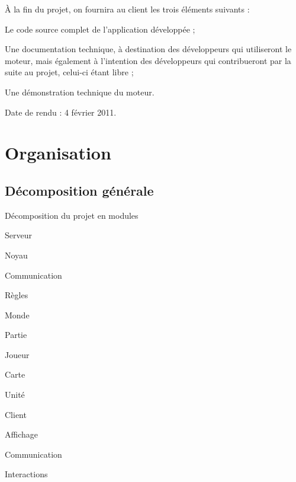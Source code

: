 \documentclass[a4paper,10pt]{report}
\begin{document}
    À la fin du projet, on fournira au client les trois éléments suivants : 
    
    \begin{list}{-}{}
      \item{Le code source complet de l'application développée ;}
      \item{Une documentation technique, à destination des développeurs qui utiliseront le moteur, mais également à l'intention des développeurs qui contribueront par la suite au projet, celui-ci étant libre ;}
      \item{Une démonstration technique du moteur.}
    \end{list}
    
    Date de rendu : 4 février 2011.



  \chapter{Organisation}

    \section{Décomposition générale}

      Décomposition du projet en modules
      
      \begin{list}{-}{}
        \item{Serveur}
        \begin{list}{-}{}
          \item{Noyau}
          \begin{list}{-}{}
            \item{Communication}
            \item{Règles}
          \end{list}
          \item{Monde}
          \begin{list}{-}{}
            \item{Partie}
            \item{Joueur}
            \item{Carte}
            \item{Unité}
          \end{list}
        \end{list}
        
        \item{Client}
        \begin{list}{-}{}
          \item{Affichage}
          \item{Communication}
          \item{Interactions}
        \end{list}
      \end{list}
\end{document}
